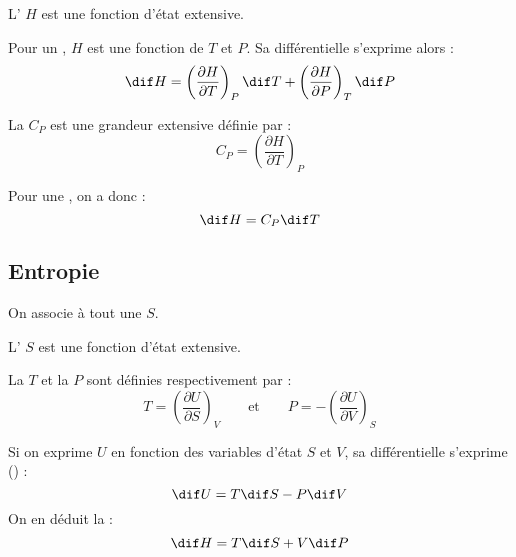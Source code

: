 \begin{propriete}
L' $H$ est une fonction d'état extensive.
\end{propriete}

\begin{propriete}
Pour un , $H$ est une fonction de $T$ et $P$. Sa différentielle s'exprime alors :
\[\dif H = \left(\frac{\partial H}{\partial T}\right)_P \dif T + \left(\frac{\partial H}{\partial P}\right)_T \dif P\]
\end{propriete}

\begin{definition}
La  $C_P$ est une grandeur extensive définie par :
\[C_P = \left(\frac{\partial H}{\partial T}\right)_P\]
\end{definition}

\begin{remarque}
Pour une , on a donc :
\[\dif H = C_P \dif T\]
\end{remarque}



\subsection{Entropie}

\begin{definition}
On associe à tout  une  $S$.
\end{definition}

\begin{propriete}
L' $S$ est une fonction d'état extensive.
\end{propriete}

\begin{definition}
La  $T$ et la  $P$ sont définies respectivement par :
\[T = \left(\frac{\partial U}{\partial S}\right)_V \qquad \text{et} \qquad P = -\left(\frac{\partial U}{\partial V}\right)_S\]
\end{definition}

\begin{propriete}
Si on exprime $U$ en fonction des variables d'état $S$ et $V$, sa différentielle s'exprime () :
\[\dif U = T \dif S - P \dif V\]
On en déduit la  :
\[\dif H = T \dif S + V \dif P\]
\end{propriete}




